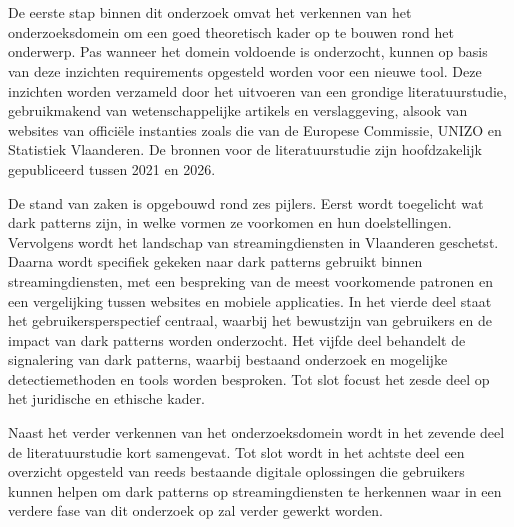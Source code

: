\chapter{}%
\label{ch:stand-van-zaken}


\vspace{1em}

De eerste stap binnen dit onderzoek omvat het verkennen van het onderzoeksdomein om een goed theoretisch kader op te bouwen rond het onderwerp. Pas wanneer het domein voldoende is onderzocht, kunnen op basis van deze inzichten requirements opgesteld worden voor een nieuwe tool. Deze inzichten worden verzameld door het uitvoeren van een grondige literatuurstudie, gebruikmakend van wetenschappelijke artikels en verslaggeving, alsook van websites van officiële instanties zoals die van de Europese Commissie, UNIZO en Statistiek Vlaanderen. De bronnen voor de literatuurstudie zijn hoofdzakelijk gepubliceerd tussen 2021 en 2026.

\vspace{1em}

De stand van zaken is opgebouwd rond zes pijlers. Eerst wordt toegelicht wat dark patterns zijn, in welke vormen ze voorkomen en hun doelstellingen. Vervolgens wordt het landschap van streamingdiensten in Vlaanderen geschetst. Daarna wordt specifiek gekeken naar dark patterns gebruikt binnen streamingdiensten, met een bespreking van de meest voorkomende patronen en een vergelijking tussen websites en mobiele applicaties. In het vierde deel staat het gebruikersperspectief centraal, waarbij het bewustzijn van gebruikers en de impact van dark patterns worden onderzocht. Het vijfde deel behandelt de signalering van dark patterns, waarbij bestaand onderzoek en mogelijke detectiemethoden en tools worden besproken. Tot slot focust het zesde deel op het juridische en ethische kader. 

\vspace{1em}

Naast het verder verkennen van het onderzoeksdomein wordt in het zevende deel de literatuurstudie kort samengevat. Tot slot wordt in het achtste deel een overzicht opgesteld van reeds bestaande digitale oplossingen die gebruikers kunnen helpen om dark patterns op streamingdiensten te herkennen waar in een verdere fase van dit onderzoek op zal verder gewerkt worden.

